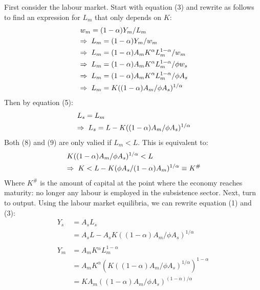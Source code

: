\documentclass[a4paper]{article}
\begin{document}
First consider the labour market. Start with equation (3) and rewrite as follows to find an expression for $L_m$ that only depends on $K$:
\begin{align}
	& \hspace{0.1cm} w_m=(1-{\alpha})Y_m/L_m \nonumber\\
	& \Rightarrow\hspace{0.1cm} L_m=(1-{\alpha})Y_m/w_m \nonumber\\
    & \Rightarrow\hspace{0.1cm} L_m=(1-{\alpha})A_mK^{\alpha}L_m^{1-{\alpha}}/w_m \nonumber\\
    & \Rightarrow\hspace{0.1cm} L_m=(1-{\alpha})A_mK^{\alpha}L_m^{1-{\alpha}}/{\phi}w_s \nonumber\\
    & \Rightarrow\hspace{0.1cm} L_m=(1-{\alpha})A_mK^{\alpha}L_m^{1-{\alpha}}/{\phi}A_s \nonumber\\
    & \Rightarrow\hspace{0.1cm} L_m=K((1-{\alpha})A_m/{\phi}A_s)^{1/{\alpha}}
\end{align}
Then by equation (5):
\begin{align}
	&\hspace{0.1cm} L_s=L_m \nonumber\\
	& \Rightarrow\hspace{0.1cm} L_s=L-K((1-{\alpha})A_m/{\phi}A_s)^{1/{\alpha}}
\end{align}
Both (8) and (9) are only valied if $L_m<L$. This is equivalent to:
\begin{align}
	&\hspace{0.1cm} K((1-{\alpha})A_m/{\phi}A_s)^{1/{\alpha}}<L \nonumber\\
	& \Rightarrow\hspace{0.1cm} K<L-K({\phi}A_s/(1-{\alpha})A_m)^{1/{\alpha}}\hspace{0.1cm}{\equiv}\hspace{0.1cm}K^{\#}
\end{align}
\newpage \noindent
Where $K^{\#}$ is the amount of capital at the point where the economy reaches maturity: no longer any labour is employed in the subsistence sector. Next, turn to output. Using the labour market equilibria, we can rewrite equation (1) and (3):
\begin{align}
 Y_s &= A_sL_s \nonumber\\
 &= A_sL-A_sK((1-{\alpha})A_m/{\phi}A_s)^{1/{\alpha}}\\
 & \nonumber\\
 Y_m &= A_mK{^\alpha}L_m^{1-\alpha} \nonumber\\
 &= A_mK^{\alpha}(K((1-{\alpha})A_m/{\phi}A_s)^{1/\alpha})^{1-\alpha}\nonumber\\
 &= KA_m((1-{\alpha})A_m/{\phi}A_s)^{(1-\alpha)/\alpha}
\end{align}
\end{document}
